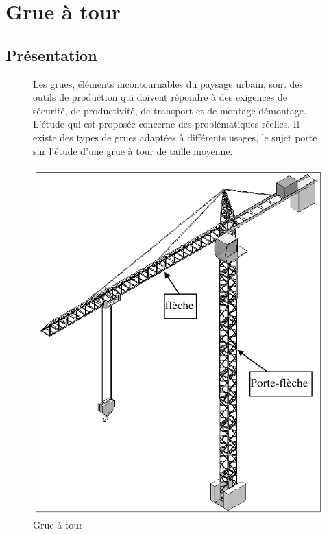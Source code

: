 
\section{Grue à tour}
 
\subsection{Présentation}

\begin{figure}[!h]
 \begin{minipage}{0.60\linewidth}
Les grues, éléments incontournables du paysage urbain, sont des outils de production qui doivent répondre à des exigences de sécurité, de productivité, de transport et de montage-démontage. L'étude qui est proposée concerne des problématiques réelles.
Il existe des types de grues adaptées à différents usages, le sujet porte sur l'étude d'une grue à tour de taille moyenne.
 \end{minipage}
\hfill
 \begin{minipage}{0.35\linewidth}
  \centering\includegraphics[width=0.7\linewidth]{img/grue0.png}
  \caption{Grue à tour}
  \label{img:grue0}
 \end{minipage}
\end{figure}

